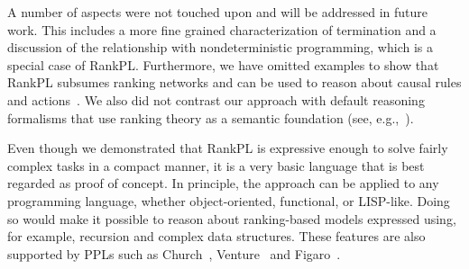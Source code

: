 \documentclass{llncs}
\begin{document}
A number of aspects were not touched upon and will be addressed in future work.
This includes a more fine grained characterization of termination
	and a discussion of the relationship with nondeterministic programming, 
	which is a special case of RankPL.
Furthermore, we have omitted examples to show that RankPL
	subsumes ranking networks 
	and can be used to reason about causal rules and actions~\cite{goldszmidt1996qualitative}.
We also did not contrast our approach 
	with default reasoning formalisms that use ranking theory as a semantic foundation (see, e.g.,~\cite{DBLP:conf/tark/Pearl90}).

Even though we demonstrated that RankPL is expressive enough to solve 
	fairly complex tasks in a compact manner, it is a very basic language that is best regarded as proof of concept.
In principle, the approach can be applied to any programming language,
	whether object-oriented, functional, or LISP-like.
Doing so would make it possible to reason about ranking-based models expressed using, for example, recursion and complex data structures.
These features are also supported by PPLs such as Church~\cite{DBLP:conf/uai/GoodmanMRBT08}, 
	Venture~\cite{DBLP:journals/corr/MansinghkaSP14} and Figaro~\cite{pfeffer2009figaro}. 
	







\end{document}
